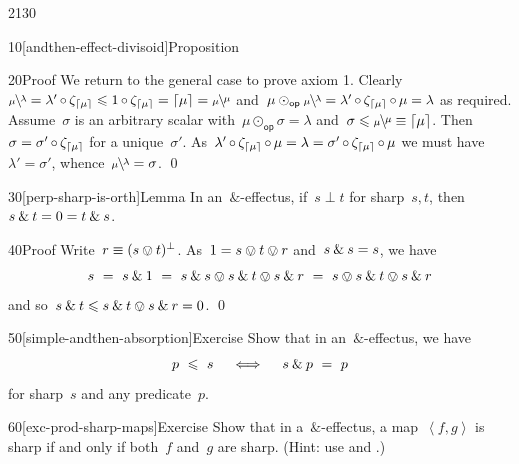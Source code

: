\begin{parsec}{2130}
\begin{point}{10}[andthen-effect-divisoid]{Proposition}
\begin{point}{20}{Proof}
We return to the general case to prove axiom 1.
Clearly~$\rfrac{\lambda}{\mu} = \lambda' \after \zeta_{\ceil{\mu}}
            \leq 1 \after \zeta_{\ceil{\mu}} = \ceil{\mu} 
            = \rfrac{\mu}{\mu}$
    and~$\mu \odot_{\mathsf{op}} \rfrac{\lambda}{\mu}
= \lambda'  \after \zeta_{\ceil{\mu}} \after \mu = \lambda$
as required.
Assume~$\sigma$ is an arbitrary
    scalar with~$\mu \odot_{\mathsf{op}} \sigma = \lambda$
    and~$\sigma \leq \rfrac{\mu}{\mu} \equiv \ceil{\mu}$.
Then~$\sigma = \sigma' \mathop{\circ} \zeta_{\left\lceil\mu\right\rceil}$
    for a unique~$\sigma'$.
As~$
\lambda'  \mathop{\circ} \zeta_{\left\lceil\mu\right\rceil} \mathop{\circ} \mu = \lambda
= \sigma' \mathop{\circ} \zeta_{\left\lceil\mu\right\rceil} \mathop{\circ} \mu$
we must have~$\lambda' = \sigma'$, whence~$\rfrac{\lambda}{\mu}=\sigma$. \qed
\end{point}
\end{point}
\begin{point}{30}[perp-sharp-is-orth]{Lemma}%
In an~$\&$-effectus, if~$s \perp t$
    for sharp~$s,t$, then~$s \mathbin{\&} t = 0 = t \mathbin{\&} s$.
\begin{point}{40}{Proof}%
Write~$r \equiv (s \ovee t)^\perp$.
    As~$1 = s \ovee t \ovee r$ and~$s \mathbin{\&} s=s$, we have
\begin{equation*}
    s \ = \ 
    \andthen{s}{1} \ = \ 
    \andthen{s}{s} \ovee \andthen{s}{t} \ovee \andthen{s}{r} \ = \ 
    s \ovee \andthen{s}{t} \ovee \andthen{s}{r}
\end{equation*}
and so~$s \mathbin{\&} t \leqslant s \mathbin{\&} t \ovee s \mathbin{\&} r = 0$. \qed
\end{point}
\end{point}
\begin{point}{50}[simple-andthen-absorption]{Exercise}%
Show that in an~$\&$-effectus, we have
\begin{equation*}
p \ \leqslant\  s \quad \iff \quad s \mathbin{\&} p \ =\  p
\end{equation*}
for sharp~$s$ and any predicate~$p$.
\end{point}
\begin{point}{60}[exc-prod-sharp-maps]{Exercise}%
Show that in a~$\&$-effectus,
    a map~$\left<f,g\right>$
    is sharp if and only if both~$f$ and~$g$ are sharp.
    (Hint: use  and .)
\end{point}
\end{parsec}


